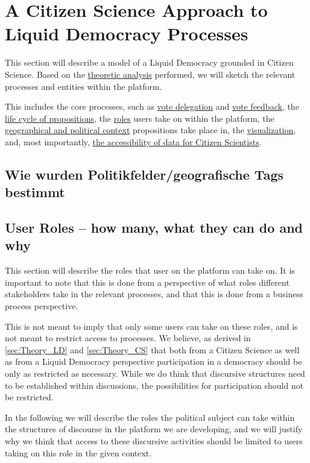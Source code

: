 \chapter{A Citizen Science Approach to Liquid Democracy Processes}
\label{ch:Approach}

This section will describe a model of a Liquid Democracy grounded in Citizen Science. Based on the \href{sec:Theory}{theoretic analysis} performed, we will sketch the relevant processes and entities within the platform. 

This includes the core processes, such as \href{ssec:Model_VoteDelegation}{vote delegation} and \href{ssec:Model_VoteFeedback}{vote feedback}, the \href{ssec:Model_Propositions}{life cycle of propositions}, the \href{ssec:UserRoles}{roles} users take on within the platform, the \href{ssec:Model_Contexts}{geographical and political context} propositions take place in, the \href{ssec:Model_Visualization}{visualization}, and, most importantly, \href{ssec:Model_ResearchersAccess}{the accessibility of data for Citizen Scientists}. 

\section{Wie wurden Politikfelder/geografische Tags bestimmt}
\label{sec:Model_Contexts}

\section{User Roles -- how many, what they can do and why}
\label{sec:UserRoles}
This section will describe the roles that user on the platform can take on.
It is important to note that this is done from a perspective of what roles different stakeholders take in the relevant processes, and that this is done from a business process perspective.

This is not meant to imply that only some users can take on these roles, and is not meant to restrict access to processes. We believe, as derived in \ref{sec:Theory_LD} and \ref{sec:Theory_CS} that both from a Citizen Science as well as from a Liquid Democracy perspective participation in a democracy should be only as restricted as necessary. While we do think that discursive structures need to be established within discussions, the possibilities for participation should not be restricted.

In the following we will describe the roles the political subject can take within the structures of discourse in the platform we are developing, and we will justify why we think that access to these discursive activities should be limited to users taking on this role in the given context.

